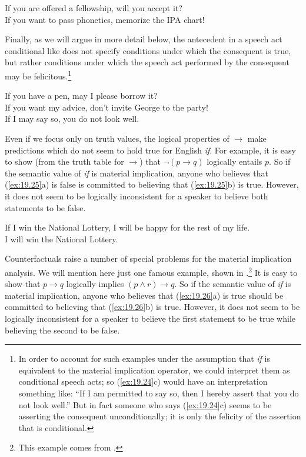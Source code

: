\ea \label{ex:19.23}
\ea  If you are offered a fellowship, will you accept it?\\
\ex If you want to pass phonetics, memorize the IPA chart!
                       \z
\z


Finally, as we will argue in more detail below, the antecedent in a speech act conditional like  does not specify conditions under which the consequent is true, but rather conditions under which the speech act performed by the consequent may be felicitous.\footnote{In order to account for such examples under the assumption that \textit{if} is equivalent to the material implication operator, we could interpret them as conditional speech acts; so (\ref{ex:19.24}c) would have an interpretation something like: “If I am permitted to say so, then I hereby assert that you do not look well.” But in fact someone who says (\ref{ex:19.24}c) seems to be asserting the consequent unconditionally; it is only the felicity of the assertion that is conditional.}


\ea \label{ex:19.24}
\ea  If you have a pen, may I please borrow it?\\
\ex If you want my advice, don’t invite George to the party!\\
\ex If I may say so, you do not look well.
    \z
\z


Even if we focus only on truth values, the logical properties of $\rightarrow$ make predictions which do not seem to hold true for English \textit{if}. For example, it is easy to show (from the truth table for $\rightarrow$) that $\neg(p\rightarrow q)$ logically entails $p$. So if the semantic value of \textit{if} is material implication, anyone who believes that (\ref{ex:19.25}a) is false is committed to believing that (\ref{ex:19.25}b) is true. However, it does not seem to be logically inconsistent for a speaker to believe both statements to be false.


\ea \label{ex:19.25}
\ea If I win the National Lottery, I will be happy for the rest of my life.\\
\ex I will win the National Lottery.
    \z
\z


Counterfactuals raise a number of special problems for the material implication analysis. We will mention here just one famous example, shown in .\footnote{This example comes from \citet{Lewis1973a}.} It is easy to show that $p\rightarrow q$ logically implies $(p \wedge r) \rightarrow q$. So if the semantic value of \textit{if} is material implication, anyone who believes that (\ref{ex:19.26}a) is true should be committed to believing that (\ref{ex:19.26}b) is true. However, it does not seem to be logically inconsistent for a speaker to believe the first statement to be true while believing the second to be false.


